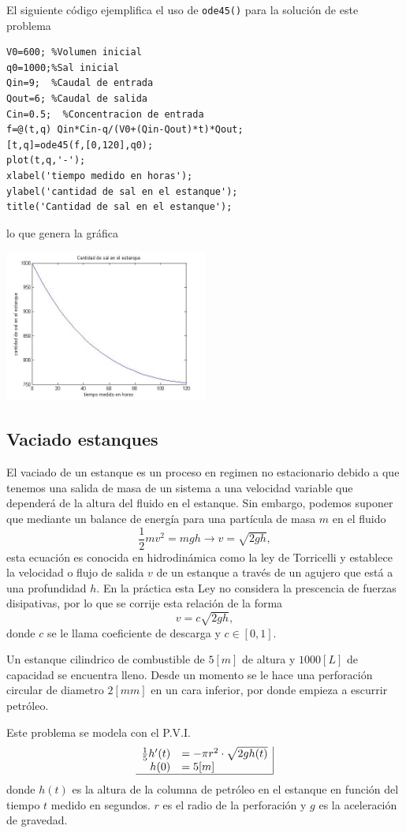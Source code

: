 \documentclass[11pt]{article}
\begin{document}
El siguiente c\'odigo ejemplifica el uso de \texttt{ode45()} para la soluci\'on de este problema
\begin{lstlisting}
V0=600; %Volumen inicial
q0=1000;%Sal inicial
Qin=9;  %Caudal de entrada
Qout=6; %Caudal de salida
Cin=0.5;  %Concentracion de entrada
f=@(t,q) Qin*Cin-q/(V0+(Qin-Qout)*t)*Qout;
[t,q]=ode45(f,[0,120],q0);
plot(t,q,'-');
xlabel('tiempo medido en horas');
ylabel('cantidad de sal en el estanque');
title('Cantidad de sal en el estanque');
\end{lstlisting}
lo que genera la gr\'afica
\begin{center}
\includegraphics[width=0.5\textwidth]{eje2.jpg}
\end{center}

\subsection{Vaciado estanques}
El vaciado de un estanque es un proceso en regimen no estacionario debido a que tenemos una salida de masa de un sistema a una velocidad variable que dependerá de la altura del fluido en el estanque. Sin embargo, podemos suponer que mediante un balance de energía para una part\'icula de masa $m$ en el fluido
$$
\frac{1}{2}mv^2=mgh \rightarrow v=\sqrt{2gh},
$$
esta ecuaci\'on es conocida en hidrodin\'amica como la ley de Torricelli y establece la velocidad o flujo de salida $v$ de un estanque a trav\'es de un agujero que est\'a a una profundidad $h$. En la pr\'actica esta Ley no considera la prescencia de fuerzas disipativas, por lo que se corrije esta relaci\'on de la forma
$$
v=c\sqrt{2gh},
$$
donde $c$ se le llama coeficiente de descarga y $c\in[0,1]$.

Un estanque cilindrico de combustible de $5[m]$ de altura y $1000[L]$ de capacidad se encuentra lleno. Desde un momento se le hace una perforación circular de diametro $2[mm]$ en un cara inferior, por donde empieza a escurrir petr\'oleo. 

Este problema se modela con el P.V.I.
$$
\begin{array}{rl|}
\frac{1}{5}h'(t)	&= -\pi r^2\cdot \sqrt{2 g h(t)}\\
h(0)	&= 5[m] \\ \hline
\end{array}
$$
donde $h(t)$ es la altura de la columna de petr\'oleo en el estanque en funci\'on del tiempo $t$ medido en segundos. $r$ es el radio de la perforaci\'on y $g$ es la aceleraci\'on de gravedad.
\end{document}
